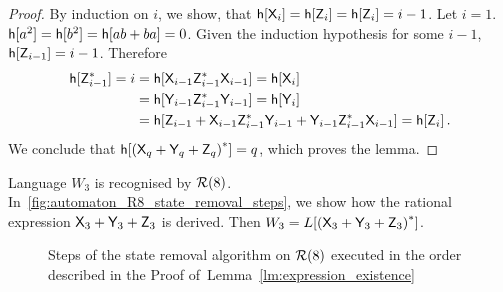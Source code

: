 \begin{proof}
    By induction on $i$, we show, that ${\mathsf{h}[{\mathsf{X}}_i]} = {\mathsf{h}[{\mathsf{Z}}_i]} = {\mathsf{h}[{\mathsf{Z}}_i]} = i-1$. Let $i=1$. ${\mathsf{h}[a^2]} = {\mathsf{h}[b^2]} = {\mathsf{h}[ab+ba]} = 0$. Given the induction hypothesis for some $i - 1$,
    ${\mathsf{h}[{\mathsf{Z}}_{i-1}]} = i-1$. Therefore
    \begin{align*}
        {\mathsf{h}[{\mathsf{Z}}_{i-1}^*]} = i &= {\mathsf{h}[{\mathsf{X}}_{i-1} {\mathsf{Z}}_{i-1}^* {\mathsf{X}}_{i-1}]} = {\mathsf{h}[{\mathsf{X}}_i]} \\
        &= {\mathsf{h}[{\mathsf{Y}}_{i-1} {\mathsf{Z}}_{i-1}^* {\mathsf{Y}}_{i-1}]} = {\mathsf{h}[{\mathsf{Y}}_i]} \\
        &= {\mathsf{h}[{\mathsf{Z}}_{i-1} + {\mathsf{X}}_{i-1} {\mathsf{Z}}_{i-1}^* {\mathsf{Y}}_{i-1} + {\mathsf{Y}}_{i-1} {\mathsf{Z}}_{i-1}^* {\mathsf{X}}_{i-1}]} = {\mathsf{h}[{\mathsf{Z}}_i]} \, .
    \end{align*}
    We conclude that ${\mathsf{h}[{({\mathsf{X}}_q + {\mathsf{Y}}_q + {\mathsf{Z}}_q)}^*]} = q$, which proves the lemma.
\end{proof}

\begin{example}
    Language $W_3$ is recognised by ${\mathcal{R}}(8)$. In~\autoref*{fig:automaton_R8_state_removal_steps}, we show how the rational expression ${\mathsf{X}}_3 + {\mathsf{Y}}_3 + {\mathsf{Z}}_3$ is derived. Then $W_3 = L[{({\mathsf{X}}_3 + {\mathsf{Y}}_3 + {\mathsf{Z}}_3)}^*]$.

    \begin{figure}[h]%
        \centerline{
            \hspace{-15mm}%
            \qquad
            \qquad
            \subfloat[]{%
                }
        }
        \vspace{5mm}
        \centerline{
            \hspace{-15mm}%
            \subfloat[]{%
                }%
            \quad
            \subfloat[]{%
                }
            \quad
        }
        \vspace{5mm}
        \centerline{
            \hspace{-15mm}%
            \subfloat[]{%
                }%
            \quad
            \quad
        }
        \caption{Steps of the state removal algorithm on ${\mathcal{R}}(8)$ executed in the order described in the Proof of~Lemma~\ref*{lm:expression_existence}}\label{fig:automaton_R8_state_removal_steps}%
    \end{figure}
\end{example}

